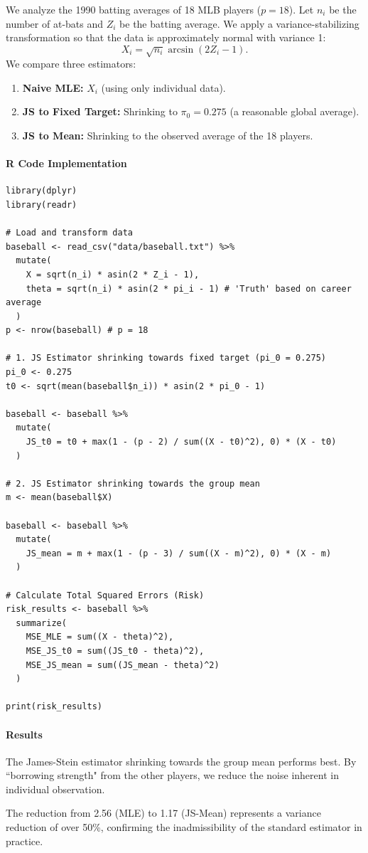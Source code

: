 \begin{ex}
We analyze the 1990 batting averages of 18 MLB players ($p=18$). Let $n_i$ be the number of at-bats and $Z_i$ be the batting average. We apply a variance-stabilizing transformation so that the data is approximately normal with variance 1:
\[
X_i = \sqrt{n_i} \arcsin(2Z_i - 1).
\]
We compare three estimators:
\begin{enumerate}
    \item \textbf{Naive MLE:} $X_i$ (using only individual data).
    \item \textbf{JS to Fixed Target:} Shrinking to $\pi_0 = 0.275$ (a reasonable global average).
    \item \textbf{JS to Mean:} Shrinking to the observed average of the 18 players.
\end{enumerate}

\paragraph{R Code Implementation}
\begin{verbatim}
library(dplyr)
library(readr)

# Load and transform data
baseball <- read_csv("data/baseball.txt") %>%
  mutate(
    X = sqrt(n_i) * asin(2 * Z_i - 1),
    theta = sqrt(n_i) * asin(2 * pi_i - 1) # 'Truth' based on career average
  )
p <- nrow(baseball) # p = 18

# 1. JS Estimator shrinking towards fixed target (pi_0 = 0.275)
pi_0 <- 0.275
t0 <- sqrt(mean(baseball$n_i)) * asin(2 * pi_0 - 1)

baseball <- baseball %>%
  mutate(
    JS_t0 = t0 + max(1 - (p - 2) / sum((X - t0)^2), 0) * (X - t0)
  )

# 2. JS Estimator shrinking towards the group mean
m <- mean(baseball$X)

baseball <- baseball %>%
  mutate(
    JS_mean = m + max(1 - (p - 3) / sum((X - m)^2), 0) * (X - m)
  )

# Calculate Total Squared Errors (Risk)
risk_results <- baseball %>%
  summarize(
    MSE_MLE = sum((X - theta)^2),
    MSE_JS_t0 = sum((JS_t0 - theta)^2),
    MSE_JS_mean = sum((JS_mean - theta)^2)
  )

print(risk_results)
\end{verbatim}

\paragraph{Results}
The James-Stein estimator shrinking towards the group mean performs best. By ``borrowing strength" from the other players, we reduce the noise inherent in individual observation.


The reduction from 2.56 (MLE) to 1.17 (JS-Mean) represents a variance reduction of over 50\%, confirming the inadmissibility of the standard estimator in practice.
\end{ex}

